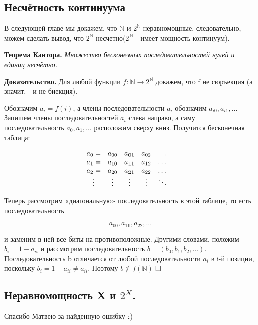 \documentclass[a4paper, 10pt]{article}
\begin{document}
\subsection{Несчётность континуума}

В следующей главе мы докажем, что $\mathbb{N}$ и $2^{\mathbb{N}}$ неравномощные, следовательно, можем сделать вывод, что $2^{\mathbb{N}}$ несчетно($2^{\mathbb{N}}$ - имеет мощность континуум). 

\medspace

\textbf{Теорема Кантора.} \textit{Множество бесконечных последовательностей нулей и единиц несчётно.}

\medspace

\textbf{Доказательство.} Для любой функции $f \colon \mathbb{N} \to 2^{\mathbb{N}}$ докажем, что f не сюръекция (а значит, - и не биекция).

Обозначим $a_i = f(i)$, а члены последовательности $a_i$ обозначим $a_{i0}, a_{i1}, \dots$ Запишем члены последовательностей $a_i$ слева направо, а саму последовательность $a_0, a_1, \dots$ расположим сверху вниз. Получится бесконечная таблица:

$$\begin{matrix}
	\centering
	a_0 = & a_{00} & a_{01} & a_{02} & \dots & \\
	a_1 = & a_{10} & a_{11} & a_{12} & \dots & \\
	a_2 = & a_{20} & a_{21} & a_{22} & \dots & \\
	\vdots & \vdots & \vdots & \vdots & \ddots \\
\end{matrix}$$

Теперь рассмотрим «диагональную» последовательность в этой таблице, то есть последовательность 

$$a_{00}, a_{11}, a_{22}, \dots$$

и заменим в ней все биты на противоположные. Другими словами, положим $b_i = 1 - a_{ii}$ и рассмотрим последовательность $b = (b_0, b_1, b_2, \dots)$. Последовательность b отличается от любой последовательности $a_i$ в i-й позиции, поскольку $b_i = 1 - a_{ii} \neq a_{ii}$. Поэтому $b \notin f(\mathbb{N})$ $\hfill \square$


\subsection{Неравномощность X и $2^X$.}

Спасибо Матвею за найденную ошибку :)

\smallskip
\end{document}
